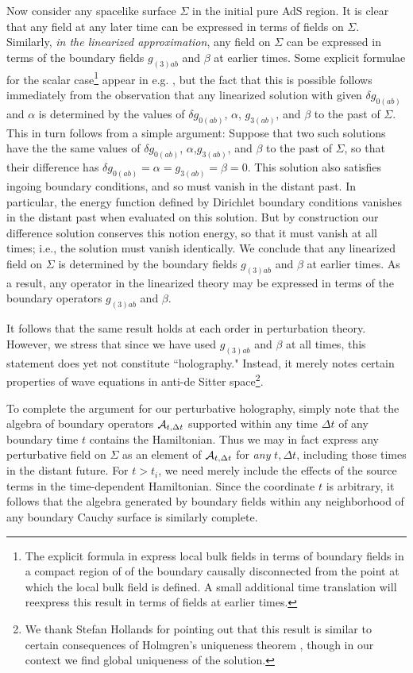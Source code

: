 \documentclass[12pt,onecolumn,eqsecnum,aps,prd,nofootinbib]{revtex4}
\begin{document}
Now consider any spacelike surface $\Sigma$ in the initial pure AdS
region. It is clear that any field at any later time can be
expressed in terms of fields on $\Sigma$.  Similarly, {\em in the
linearized approximation}, any field on $\Sigma$ can be expressed in
terms of the boundary fields $g_{(3)ab}$ and $\beta$ at earlier
times. Some explicit formulae for the scalar case\footnote{The
explicit formula in \cite{explicit} express local bulk fields in
terms of boundary fields in a compact region of of the boundary
causally disconnected from the point at which the local bulk field
is defined.  A small additional time translation will reexpress this
result in terms of fields at earlier times.} appear in e.g.
\cite{explicit}, but the fact that this is possible follows
immediately from the observation that any linearized solution with
given $\delta g_{0(ab)}$ and $\alpha$ is determined by the values of
$\delta g_{0(ab)}$, $\alpha$, $g_{3(ab)}$, and $\beta$ to the past
of $\Sigma$. This in turn follows from a simple argument: Suppose
that two such solutions have the the same values of $\delta
g_{0(ab)}$, $\alpha$,$g_{3(ab)}$, and $\beta$ to the past of
$\Sigma$, so that their difference has $\delta g_{0(ab)} = \alpha =
g_{3(ab)} = \beta =0.$ This solution also satisfies ingoing boundary
conditions, and so must vanish in the distant past. In particular,
the energy function defined by Dirichlet boundary conditions vanishes in the distant past when evaluated on this solution.  But by construction our
difference solution conserves this notion energy, so that it must vanish at all
times; i.e., the solution must vanish identically.  We conclude that any linearized field on $\Sigma$ is determined by the boundary fields $g_{(3)ab}$ and $\beta$
at earlier times.  As a result, any operator in the linearized theory may be expressed in terms of the boundary operators $g_{(3)ab}$ and $\beta$.   

It follows that the same result holds at each order in perturbation theory.
However, we stress that since we have used $g_{(3)ab}$ and $\beta$ at all times, this statement does yet not constitute ``holography."  Instead, it merely notes certain properties of wave equations in anti-de Sitter space\footnote{We thank Stefan Hollands for pointing out that this result is similar to certain consequences of Holmgren's uniqueness theorem \cite{Hor}, though in our context we find global uniqueness of the solution.}.

To complete the argument for our perturbative holography, simply note that the algebra of
boundary operators ${\cal A}_{t, \Delta t}$ supported within any
time $\Delta t$ of any boundary time $t$ contains the Hamiltonian.
Thus we may in fact express any perturbative field on $\Sigma$ as an
element of ${\cal A}_{t, \Delta t}$ for {\em any} $t, \Delta t$, including
those times in the distant future. For $t
> t_i$, we need merely include the effects of the source terms in
the time-dependent Hamiltonian.  Since the coordinate $t$ is arbitrary, it follows that the algebra
generated by boundary fields within any neighborhood of any boundary
Cauchy surface is similarly complete.
\end{document}
